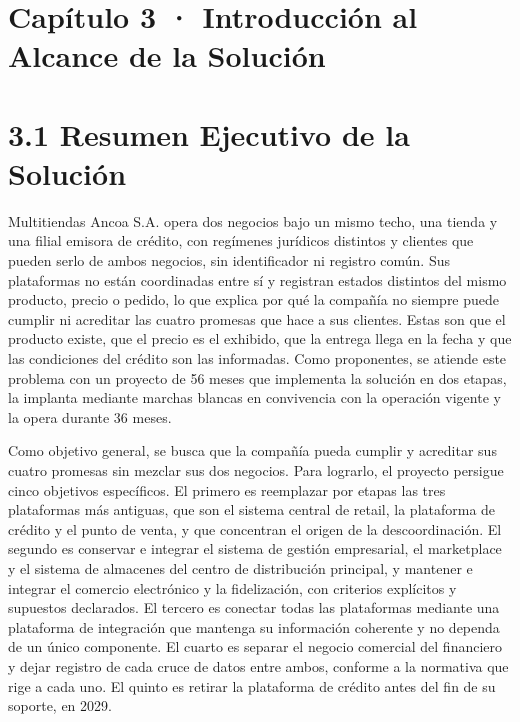 \documentclass[11pt]{article}
\begin{document}
\tableofcontents
\clearpage

\section{Capítulo 3 · Introducción al Alcance de la Solución}

\section{3.1 Resumen Ejecutivo de la Solución}

Multitiendas Ancoa S.A. opera dos negocios bajo un mismo techo, una tienda y una filial emisora de crédito, con regímenes jurídicos distintos y clientes que pueden serlo de ambos negocios, sin identificador ni registro común. Sus plataformas no están coordinadas entre sí y registran estados distintos del mismo producto, precio o pedido, lo que explica por qué la compañía no siempre puede cumplir ni acreditar las cuatro promesas que hace a sus clientes. Estas son que el producto existe, que el precio es el exhibido, que la entrega llega en la fecha y que las condiciones del crédito son las informadas. Como proponentes, se atiende este problema con un proyecto de 56 meses que implementa la solución en dos etapas, la implanta mediante marchas blancas en convivencia con la operación vigente y la opera durante 36 meses.

Como objetivo general, se busca que la compañía pueda cumplir y acreditar sus cuatro promesas sin mezclar sus dos negocios. Para lograrlo, el proyecto persigue cinco objetivos específicos. El primero es reemplazar por etapas las tres plataformas más antiguas, que son el sistema central de retail, la plataforma de crédito y el punto de venta, y que concentran el origen de la descoordinación. El segundo es conservar e integrar el sistema de gestión empresarial, el marketplace y el sistema de almacenes del centro de distribución principal, y mantener e integrar el comercio electrónico y la fidelización, con criterios explícitos y supuestos declarados. El tercero es conectar todas las plataformas mediante una plataforma de integración que mantenga su información coherente y no dependa de un único componente. El cuarto es separar el negocio comercial del financiero y dejar registro de cada cruce de datos entre ambos, conforme a la normativa que rige a cada uno. El quinto es retirar la plataforma de crédito antes del fin de su soporte, en 2029.
\end{document}
